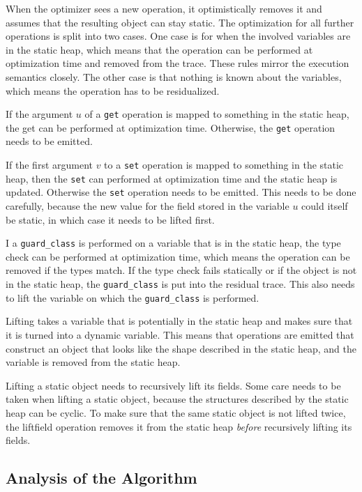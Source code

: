 \documentclass{sigplanconf}
\begin{document}
When the optimizer sees a new operation, it optimistically removes it and
assumes that the resulting object can stay static. The optimization for all
further operations is split into two cases. One case is for when the
involved variables are in the static heap, which means that the operation can be
performed at optimization time and removed from the trace. These rules mirror
the execution semantics closely. The other case is that nothing is known about
the variables, which means the operation has to be residualized.

If the argument $u$ of a \texttt{get} operation is mapped to something in the static
heap, the get can be performed at optimization time. Otherwise, the \texttt{get}
operation needs to be emitted.

If the first argument $v$ to a \texttt{set} operation is mapped to something in the
static heap, then the \texttt{set} can performed at optimization time and the static heap
is updated. Otherwise the \texttt{set} operation needs to be emitted. This needs to be
done carefully, because the new value for the field stored in the variable $u$
could itself be static, in which case it needs to be lifted first.

I a \texttt{guard\_class} is performed on a variable that is in the static heap, the type check
can be performed at optimization time, which means the operation can be removed
if the types match. If the type check fails statically or if the object is not
in the static heap, the \texttt{guard\_class} is put into the residual trace. This also needs to
lift the variable on which the \texttt{guard\_class} is performed.

Lifting takes a variable that is potentially in the static heap and makes sure
that it is turned into a dynamic variable. This means that operations are
emitted that construct an object that looks like the shape described in the
static heap, and the variable is removed from the static heap.

Lifting a static object needs to recursively lift its fields. Some care needs to
be taken when lifting a static object, because the structures described by the
static heap can be cyclic. To make sure that the same static object is not lifted
twice, the liftfield operation removes it from the static heap \emph{before}
recursively lifting its fields.



\subsection{Analysis of the Algorithm}
\label{sub:analysis}
\end{document}
